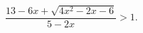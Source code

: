 \begin{ex}[type=inequality]
	\begin{condition}
		$\dfrac{13 - 6x + \sqrt{4x^2 - 2x - 6}}{5 - 2x}>1 .$
	\end{condition}
\end{ex}